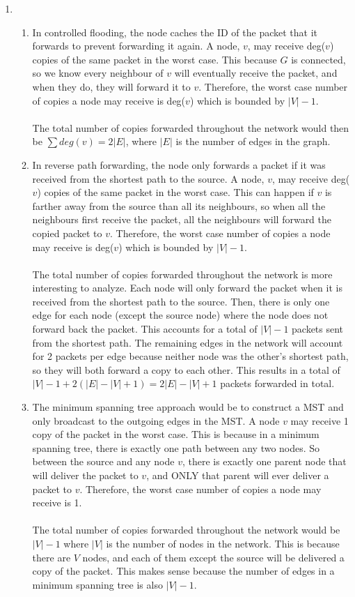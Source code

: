 \documentclass[12pt]{article}
\begin{document}
\begin{enumerate}
\item
\begin{enumerate}
    \item In controlled flooding, the node caches the ID of the packet that it forwards to prevent forwarding it again. A node, $v$, may receive deg($v$) copies of the same packet in the worst case. This because $G$ is connected, so we know every neighbour of $v$ will eventually receive the packet, and when they do, they will forward it to $v$. Therefore, the worst case number of copies a node may receive is deg($v$) which is bounded by $|V|-1$.  \\ \\
    The total number of copies forwarded throughout the network would then be $\sum deg(v) = 2|E|$, where $|E|$ is the number of edges in the graph. \\ 
    \item In reverse path forwarding, the node only forwards a packet if it was received from the shortest path to the source. A node, $v$, may receive deg($v$) copies of the same packet in the worst case. This can happen if $v$ is farther away from the source than all its neighbours, so when all the neighbours first receive the packet, all the neighbours will forward the copied packet to $v$. Therefore, the worst case number of copies a node may receive is deg($v$) which is bounded by $|V|-1$. \\ \\   
    The total number of copies forwarded throughout the network is more interesting to analyze. Each node will only forward the packet when it is received from the shortest path to the source. Then, there is only one edge for each node (except the source node) where the node does not forward back the packet. This accounts for a total of $|V| - 1$ packets sent from the shortest path. The remaining edges in the network will account for 2 packets per edge because neither node was the other's shortest path, so they will both forward a copy to each other. This results in a total of $|V| - 1 + 2(|E| - |V| + 1) = 2|E| - |V| + 1$ packets forwarded in total.  \\ 
    \item The minimum spanning tree approach would be to construct a MST and only broadcast to the outgoing edges in the MST. A node $v$ may receive 1 copy of the packet in the worst case. This is because in a minimum spanning tree, there is exactly one path between any two nodes. So between the source and any node $v$, there is exactly one parent node that will deliver the packet to $v$, and ONLY that parent will ever deliver a packet to $v$. Therefore, the worst case number of copies a node may receive is 1.\\ \\
    The total number of copies forwarded throughout the network would be $|V| - 1$ where $|V|$ is the number of nodes in the network. This is because there are $V$ nodes, and each of them except the source will be delivered a copy of the packet. This makes sense because the number of edges in a minimum spanning tree is also $|V| - 1$.
\end{enumerate}
\end{enumerate}
\end{document}
